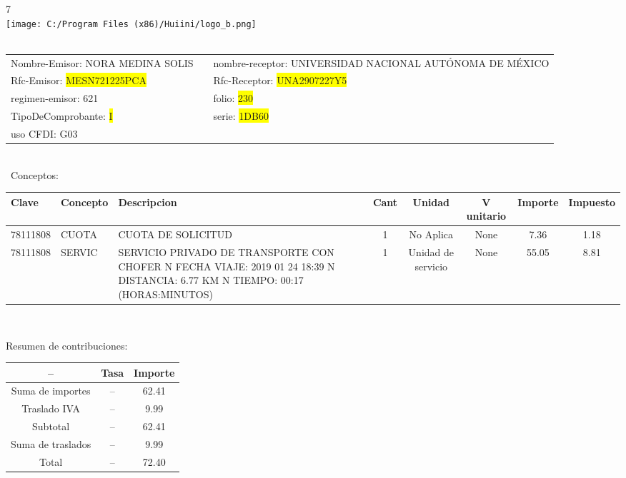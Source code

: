 \documentclass{article}
\begin{document}
\hspace{18cm} 7\\
\texttt{[image: C:/Program Files (x86)/Huiini/logo\_b.png]}
\bigskip\\\
\begin{tabular}{p{11cm}p{1cm}p{8cm}}

Nombre-Emisor: NORA MEDINA SOLIS && nombre-receptor: UNIVERSIDAD NACIONAL AUTÓNOMA DE MÉXICO\\

Rfc-Emisor: \colorbox{yellow}{ MESN721225PCA } & & Rfc-Receptor: \colorbox{yellow}{ UNA2907227Y5 }\\

regimen-emisor: 621 & & folio: \colorbox{yellow}{ 230 }\\

TipoDeComprobante: \colorbox{yellow}{ I } & & serie: \colorbox{yellow}{ 1DB60 }\\

uso CFDI: G03\\



\end{tabular}
\bigskip\bigskip\bigskip\\\
Conceptos:\\
\begin{tabular}{|p{1.5cm}|p{3.6cm}|p{3.6cm}|c|c|c|c|c|}
\hline
Clave & Concepto & Descripcion & Cant & Unidad & V unitario & Importe & Impuesto \\
\hline

78111808 & CUOTA  & CUOTA DE SOLICITUD & 1 & No Aplica & None & 7.36 &  1.18 \\
\hline

78111808 & SERVIC & SERVICIO PRIVADO DE TRANSPORTE CON CHOFER  N FECHA VIAJE: 2019 01 24 18:39  N DISTANCIA: 6.77 KM  N TIEMPO: 00:17 (HORAS:MINUTOS) & 1 & Unidad de servicio & None & 55.05 &  8.81 \\
\hline

\end{tabular}\\
\bigskip
\begin{center}
Resumen de contribuciones:\\
\bigskip
\begin{tabular}{|c|c|c|}
\hline
 -- & Tasa & Importe\\
\hline

Suma de importes & -- & 62.41 \\
\hline

Traslado IVA & -- & 9.99 \\
\hline

Subtotal  & -- & 62.41 \\
\hline

Suma de traslados & -- & 9.99 \\
\hline

Total  & -- & 72.40 \\
\hline

\end{tabular}
\end{center}
\end{document}
